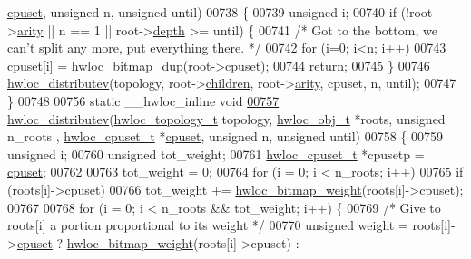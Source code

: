 \begin{DoxyCode}
      \hyperlink{a00016_a67925e0f2c47f50408fbdb9bddd0790f}{cpuset}, \textcolor{keywordtype}{unsigned} n, \textcolor{keywordtype}{unsigned} until)
00738 \{
00739   \textcolor{keywordtype}{unsigned} i;
00740   \textcolor{keywordflow}{if} (!root->\hyperlink{a00016_aac3f6da35c9b57599909a44ce2b716c1}{arity} || n == 1 || root->\hyperlink{a00016_a9d82690370275d42d652eccdea5d3ee5}{depth} >= until) \{
00741     \textcolor{comment}{/* Got to the bottom, we can't split any more, put everything there.  */}
00742     \textcolor{keywordflow}{for} (i=0; i<n; i++)
00743       cpuset[i] = \hyperlink{a00065_gaaa4ed76211cd3694dfbea2109fc440be}{hwloc_bitmap_dup}(root->\hyperlink{a00016_a67925e0f2c47f50408fbdb9bddd0790f}{cpuset});
00744     \textcolor{keywordflow}{return};
00745   \}
00746   \hyperlink{a00059_gaf057d7c5e3cb3df897ce527258537619}{hwloc_distributev}(topology, root->\hyperlink{a00016_a04d05403da37bfe17cd63b7c7dd07b1f}{children}, root->\hyperlink{a00016_aac3f6da35c9b57599909a44ce2b716c1}{arity}, cpuset, n, until);
00747 \}
00748 
00756 \textcolor{keyword}{static} \_\_hwloc\_inline \textcolor{keywordtype}{void}
\hypertarget{a00031_source_l00757}{}\hyperlink{a00059_gaf057d7c5e3cb3df897ce527258537619}{00757} \hyperlink{a00059_gaf057d7c5e3cb3df897ce527258537619}{hwloc_distributev}(\hyperlink{a00039_ga9d1e76ee15a7dee158b786c30b6a6e38}{hwloc_topology_t} topology, \hyperlink{a00016}{hwloc_obj_t} *roots, \textcolor{keywordtype}{unsigned} n\_roots
      , \hyperlink{a00040_ga4bbf39b68b6f568fb92739e7c0ea7801}{hwloc_cpuset_t} *\hyperlink{a00016_a67925e0f2c47f50408fbdb9bddd0790f}{cpuset}, \textcolor{keywordtype}{unsigned} n, \textcolor{keywordtype}{unsigned} until)
00758 \{
00759   \textcolor{keywordtype}{unsigned} i;
00760   \textcolor{keywordtype}{unsigned} tot\_weight;
00761   \hyperlink{a00040_ga4bbf39b68b6f568fb92739e7c0ea7801}{hwloc_cpuset_t} *cpusetp = \hyperlink{a00016_a67925e0f2c47f50408fbdb9bddd0790f}{cpuset};
00762 
00763   tot\_weight = 0;
00764   \textcolor{keywordflow}{for} (i = 0; i < n\_roots; i++)
00765     \textcolor{keywordflow}{if} (roots[i]->cpuset)
00766       tot\_weight += \hyperlink{a00065_ga12d520387be74f849f191d7a06ac325c}{hwloc_bitmap_weight}(roots[i]->cpuset);
00767 
00768   \textcolor{keywordflow}{for} (i = 0; i < n\_roots && tot\_weight; i++) \{
00769     \textcolor{comment}{/* Give to roots[i] a portion proportional to its weight */}
00770     \textcolor{keywordtype}{unsigned} weight = roots[i]->\hyperlink{a00016_a67925e0f2c47f50408fbdb9bddd0790f}{cpuset} ? \hyperlink{a00065_ga12d520387be74f849f191d7a06ac325c}{hwloc_bitmap_weight}(roots[i]->cpuset) : 

\end{DoxyCode}
